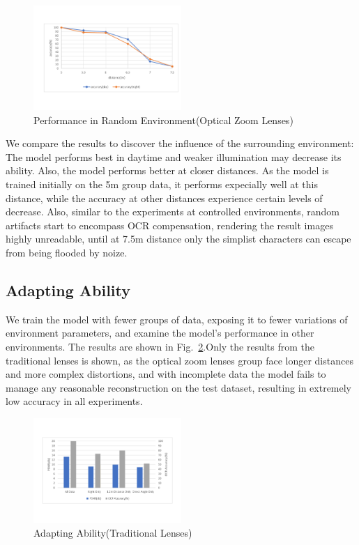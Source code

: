\begin{figure}
 \centering
    \includegraphics[width=0.5\textwidth]{./pic/distance2.pdf}
    \caption{Performance in Random Environment(Optical Zoom Lenses)}
    \label{fig-random2}
\end{figure}
We compare the results to discover the influence of the surrounding environment: The model performs best in daytime and weaker illumination may decrease its ability. Also, the model performs better at closer distances. As the model is trained initially on the 5m group data, it performs expecially well at this distance, while the accuracy at other distances experience certain levels of decrease. Also, similar to the experiments at controlled environments, random artifacts start to encompass OCR compensation, rendering the result images highly unreadable, until at 7.5m distance only the simplist characters can escape from being flooded by noize.

\subsection{Adapting Ability}
We train the model with fewer groups of data, exposing it to fewer variations of environment parameters, and examine the model’s performance in other environments. The results are shown in Fig.~\ref{table-adapt}.Only the results from the traditional lenses is shown, as the optical zoom lenses group face longer distances and more complex distortions, and with incomplete data the model fails to manage any reasonable reconstruction on the test dataset, resulting in extremely low accuracy in all experiments.

\begin{figure}
 \centering
    \includegraphics[width=0.5\textwidth]{./pic/table3.pdf}
    \caption{Adapting Ability(Traditional Lenses)}
    \label{table-adapt}
\end{figure}

